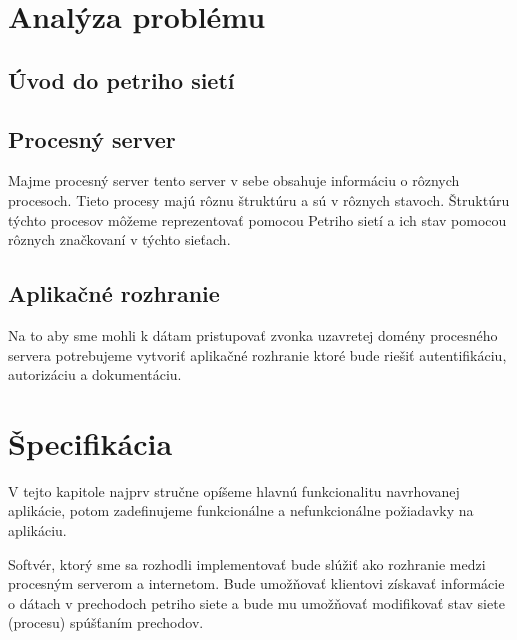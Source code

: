  

  

\section{Analýza problému} 

  

\subsection{Úvod do petriho sietí} 


\subsection{Procesný server} 

 Majme procesný server tento server v sebe obsahuje informáciu o rôznych procesoch. Tieto procesy majú rôznu štruktúru a sú v rôznych stavoch. Štruktúru týchto procesov môžeme reprezentovať pomocou Petriho sietí a ich stav pomocou rôznych značkovaní v týchto sieťach.  


  

\subsection{Aplikačné rozhranie} 

 Na to aby sme mohli k dátam pristupovať zvonka uzavretej domény procesného servera potrebujeme vytvoriť aplikačné rozhranie ktoré bude riešiť autentifikáciu, autorizáciu a dokumentáciu.  


  

  

  

  

\section{Špecifikácia} 

 V tejto kapitole najprv stručne opíšeme hlavnú funkcionalitu navrhovanej aplikácie, potom zadefinujeme funkcionálne a nefunkcionálne požiadavky na aplikáciu. 

  

Softvér, ktorý sme sa rozhodli implementovať bude slúžiť ako rozhranie medzi procesným serverom a internetom. Bude umožňovať klientovi získavať informácie o dátach v prechodoch petriho siete a bude mu umožňovať modifikovať stav siete (procesu) spúšťaním prechodov.  

